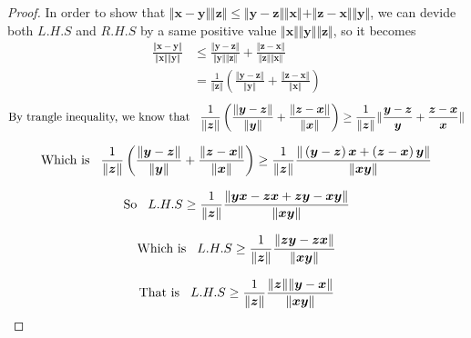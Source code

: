 \documentclass[12pt]{article}
\renewcommand{\vec}[1]{\boldsymbol{#1}}
\begin{document}
\begin{proof}

    In order to show that $ \Vert \vec x  -  \vec y \Vert \Vert \vec z \Vert \leq
    \Vert \vec y  -  \vec z \Vert \Vert \vec x \Vert + 
    \Vert \vec z  -  \vec x \Vert \Vert \vec y \Vert $, we can devide both $L.H.S$ and
    $R.H.S$ by a same positive value $ \Vert \vec x \Vert \Vert \vec y \Vert 
    \Vert \vec z \Vert $, so it becomes
    \begin{align*}
        \frac{\Vert \vec x - \vec y \Vert}{\Vert \vec x \Vert \Vert \vec y \Vert} & \leq
        \frac{\Vert \vec y - \vec z \Vert}{\Vert \vec y \Vert \Vert \vec z \Vert} + 
        \frac{\Vert \vec z - \vec x \Vert}{\Vert \vec z \Vert \Vert \vec x \Vert} \\
        & = \frac{1}{\Vert \vec z \Vert} \left( \frac{\Vert \vec y - \vec z \Vert}{\Vert \vec y \Vert } + 
        \frac{\Vert \vec z - \vec x \Vert}{ \Vert \vec x \Vert} \right)
    \end{align*}
    \[ \text{By trangle inequality, we know that} \hspace*{0.3cm} \frac{1}{\Vert \vec z \Vert} 
    \left( \frac{\Vert \vec y - \vec z \Vert}{\Vert \vec y \Vert } + 
    \frac{\Vert \vec z - \vec x \Vert}{ \Vert \vec x \Vert} \right) \geq 
    \frac{1}{\Vert \vec z \Vert} 
    \Vert  \frac{ \vec y - \vec z }{ \vec y  } + 
    \frac{\vec z - \vec x }{  \vec x } \Vert \]

    \[\text{Which is} \hspace*{0.3cm} \frac{1}{\Vert \vec z \Vert} 
    \left( \frac{\Vert \vec y - \vec z \Vert}{\Vert \vec y \Vert } + 
    \frac{\Vert \vec z - \vec x \Vert}{ \Vert \vec x \Vert} \right)  \geq
    \frac{1}{\Vert \vec z \Vert} 
    \frac{\Vert \left( \vec y - \vec z \right) \vec x 
    + \left( \vec z - \vec x \right) \vec y \Vert }{\Vert  \vec x \vec y \Vert} \]
        
    \[ \text{So} \hspace*{0.3cm} L.H.S \geq 
    \frac{1}{\Vert \vec z \Vert}
    \frac{\Vert \vec y \vec x - \vec z \vec x
    + \vec z \vec y - \vec x \vec y \Vert }
     {\Vert  \vec x \vec y \Vert} \]

    \[ \text{Which is} \hspace*{0.3cm} L.H.S \geq
    \frac{1}{\Vert \vec z \Vert}
    \frac{\Vert \vec z \vec y - \vec z \vec x \Vert }
     {\Vert  \vec x \vec y \Vert} \]

    \[ \text{That is} \hspace*{0.3cm}
    L.H.S \geq \frac{1}{\Vert \vec z \Vert}
    \frac{\Vert \vec z \Vert \Vert \vec y - \vec x \Vert}{\Vert \vec x
    \vec y \Vert} \]


\end{proof}
\end{document}

